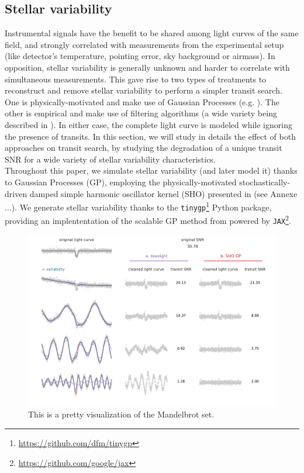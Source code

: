 \documentclass{aastex631}
\begin{document}
\subsection{Stellar variability}

Instrumental signals have the benefit to be shared among light curves of the same field, and strongly correlated with measurements from the experimental setup (like detector's temperature, pointing error, sky background or airmass). In opposition, stellar variability is generally unknown and harder to correlate with simultaneous measurements. This gave rise to two types of treatments to reconstruct and remove stellar variability to perform a simpler transit search. One is physically-motivated and make use of Gaussian Processes (e.g. \cite{k2sc}). The other is empirical and make use of filtering algorithms (a wide variety being described in \cite{wotan}). In either case, the complete light curve is modeled while ignoring the presence of transits. In this section, we will study in details the effect of both approaches on transit search, by studying the degradation of a unique transit SNR for a wide variety of stellar variability characteristics.
\bigskip\\
Throughout this paper, we simulate stellar variability (and later model it) thanks to Gaussian Processes (GP), employing the physically-motivated stochastically-driven damped simple harmonic oscillator kernel (SHO) presented in \citealt{celerite1} (see Annexe ...). We generate stellar variability thanks to the \texttt{tinygp}\footnote{\href{https://github.com/dfm/tinygp}{https://github.com/dfm/tinygp}} Python package, providing an implententation of the scalable GP method from \citealt{celerite2} powered by \texttt{JAX}\footnote{\href{https://github.com/google/jax}{https://github.com/google/jax}}.

\begin{figure}[H]
    \begin{centering}
        \includegraphics[width=\linewidth]{../figures/issue2.pdf}
        \caption{This is a pretty visualization of the Mandelbrot set.}
        \label{fig:issue2}
    \end{centering}
\end{figure}
\end{document}
